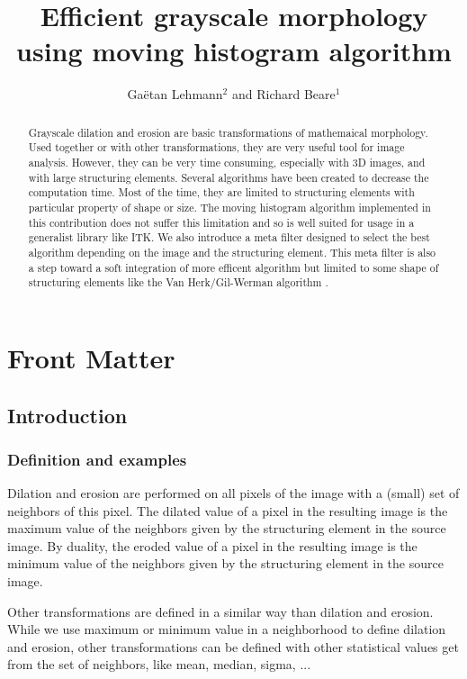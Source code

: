 \documentclass{InsightArticle}
\title{Efficient grayscale morphology using moving histogram algorithm}
\author{Ga\"etan Lehmann{$^2$} {\small{and}} Richard Beare{$^1$}}
\begin{document}
\maketitle

\ifhtml
\chapter*{Front Matter\label{front}}
\fi


\begin{abstract}
\noindent
Grayscale dilation and erosion are basic transformations of mathemaical
morphology. Used together or with other transformations, they are very useful
tool for image analysis. However, they can be very time consuming, especially
with 3D images, and with large structuring elements. Several algorithms have
been created to decrease the computation time. Most of the time, they are
limited to structuring elements with particular property of shape or size. The
moving histogram algorithm \cite{vandroogenbroeckTalbot96} implemented in this
contribution does not suffer this limitation and so is well suited for usage in
a generalist library like ITK. We also introduce a meta filter designed to
select the best algorithm depending on the image and the structuring element.
This meta filter is also a step toward a soft integration of more efficent
algorithm but limited to some shape of structuring elements like the Van
Herk/Gil-Werman algorithm \cite{vanHerk92,GilWerman93}.
\end{abstract}



\section{Introduction}

  \subsection{Definition and examples}

Dilation and erosion are performed on all pixels of the image with a (small)
set of neighbors of this pixel.
The dilated value of a pixel in the resulting image is the maximum value
of the neighbors given by the structuring element in the source image.
By duality, the eroded value of a pixel in the resulting image is the
minimum value of the neighbors given by the structuring element in the
source image.

Other transformations are defined in a similar way than dilation and erosion.
While we use maximum or minimum value in a neighborhood to define dilation and
erosion, other transformations can be defined with other statistical values
get from the set of neighbors, like mean, median, sigma, ...
\end{document}
